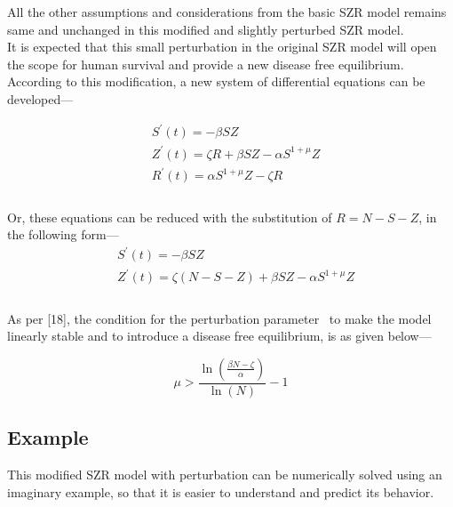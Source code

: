 All the other assumptions and considerations from the basic SZR model remains same and unchanged in this modified and slightly perturbed SZR model. \\

It is expected that this small perturbation in the original SZR model will open the scope for human survival and provide a new disease free equilibrium. \\

According to this modification, a new system of differential equations can be developed--- 

\begin{equation}
\begin{aligned}
&S^{\prime}(t)=-\beta SZ \\
&Z^{\prime}(t)=\zeta R + \beta SZ - \alpha S^{1 + \mu} Z\\
&R^{\prime}(t)=\alpha S^{1 + \mu} Z - \zeta R \\
\end{aligned}
\end{equation}
\\

Or, these equations can be reduced with the substitution of $R = N - S - Z$, in the following form--- \\

\begin{equation}
\begin{aligned}
&S^{\prime}(t)=-\beta SZ \\
&Z^{\prime}(t)=\zeta (N - S - Z) + \beta SZ - \alpha S^{1 + \mu} Z\\
\end{aligned}
\end{equation}
\\

As per [18], the condition for the perturbation parameter \textmu \ to make the model linearly stable and to introduce a disease free equilibrium, is as given below---

\begin{equation}
\mu>\frac{\ln \left(\frac{\beta N-\zeta}{\alpha}\right)}{\ln (N)}-1
\end{equation}

\pagebreak
\subsection{Example}

This modified SZR model with perturbation can be numerically solved using an imaginary example, so that it is easier to understand and predict its behavior. \\


